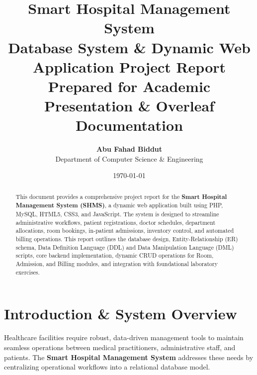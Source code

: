 \documentclass[12pt, a4paper]{article}
\title{
    \textbf{\huge Smart Hospital Management System}\\
    \Large Database System \& Dynamic Web Application Project Report\\
    \vspace{0.5cm}
    \small Prepared for Academic Presentation \& Overleaf Documentation
}
\author{
    \textbf{Abu Fahad Biddut}\\
    Department of Computer Science \& Engineering
}
\date{\today}
\begin{document}
\maketitle

\begin{abstract}
This document provides a comprehensive project report for the \textbf{Smart Hospital Management System (SHMS)}, a dynamic web application built using PHP, MySQL, HTML5, CSS3, and JavaScript. The system is designed to streamline administrative workflows, patient registrations, doctor schedules, department allocations, room bookings, in-patient admissions, inventory control, and automated billing operations. This report outlines the database design, Entity-Relationship (ER) schema, Data Definition Language (DDL) and Data Manipulation Language (DML) scripts, core backend implementation, dynamic CRUD operations for Room, Admission, and Billing modules, and integration with foundational laboratory exercises.
\end{abstract}

\tableofcontents
\newpage

\section{Introduction \& System Overview}
Healthcare facilities require robust, data-driven management tools to maintain seamless operations between medical practitioners, administrative staff, and patients. The \textbf{Smart Hospital Management System} addresses these needs by centralizing operational workflows into a relational database model.
\end{document}
